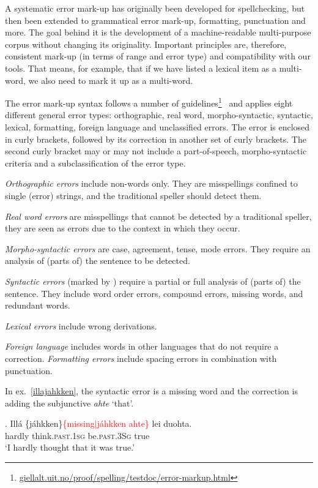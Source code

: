 \documentclass[free]{flammie}
\begin{document}
A systematic error mark-up has originally been developed for spellchecking, but
then been extended to grammatical error mark-up, formatting, punctuation and
more. The goal behind it is the development of a machine-readable multi-purpose
corpus without changing its originality.  Important principles are, therefore,
consistent mark-up (in terms of range and error type) and compatibility with our
tools. That means, for example, that if we have listed a lexical item as a
multi-word, we also need to mark it up as a multi-word.




The error mark-up syntax follows a number of
guidelines\footnote{\href{https://giellalt.uit.no/proof/spelling/testdoc/error-markup.html}{giellalt.uit.no/proof/spelling/testdoc/error-markup.html}}~\cite{moshagen2014test}
and applies eight different general error types: orthographic, real word,
morpho-syntactic, syntactic, lexical, formatting, foreign language and
unclassified errors.  The error is enclosed in curly brackets, followed by its
correction in another set of curly brackets.  The second curly bracket may or
may not include a part-of-speech, morpho-syntactic criteria and a
subclassification of the error type.

\emph{Orthographic errors} include non-words only. They are misspellings
confined to single (error) strings, and the traditional speller should detect
them.

\emph{Real word errors} are misspellings that cannot be detected by a
traditional speller, they are seen as errors due to the context in which they
occur.

\emph{Morpho-syntactic errors} are case, agreement, tense, mode errors. They
require an analysis of (parts of) the sentence to be detected.

\emph{Syntactic errors} (marked by \textyen) require a partial or full analysis
of (parts of) the sentence. They include word order errors, compound errors,
missing words, and redundant words.

\emph{Lexical errors} include wrong derivations.

\emph{Foreign language} includes words in other languages that do not require a
correction.  \emph{Formatting errors} include spacing errors in combination with
punctuation.


In ex.~\ref{illajahkken}, the syntactic error is a missing word and the
correction is adding the subjunctive \textit{ahte} `that'.

\exg. Illá \{jáhkken\}\textcolor{red}{\textyen\{missing$|$jáhkken ahte\}} lei
duohta.\label{illajahkken}\\
hardly think\textsc{.past.1sg} be\textsc{.past.3Sg} true\\
`I hardly thought that it was true.'
\end{document}

